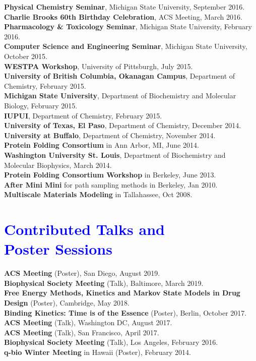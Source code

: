\documentclass[margin,line]{res}
\begin{document}
\begin{resume}
{\bf Physical Chemistry Seminar}, Michigan State University, September 2016. \\
{\bf Charlie Brooks 60th Birthday Celebration}, ACS Meeting, March 2016. \\
{\bf Pharmacology \& Toxicology Seminar}, Michigan State University, February 2016. \\
{\bf Computer Science and Engineering Seminar}, Michigan State University, October 2015. \\
{\bf WESTPA Workshop}, University of Pittsburgh, July 2015. \\
{\bf University of British Columbia, Okanagan Campus}, Department of Chemistry, February 2015. \\
{\bf Michigan State University}, Department of Biochemistry and Molecular Biology, February 2015. \\
{\bf IUPUI}, Department of Chemistry, February 2015. \\
{\bf University of Texas, El Paso}, Department of Chemistry, December 2014. \\
{\bf University at Buffalo}, Department of Chemistry, November 2014. \\
{\bf Protein Folding Consortium} in Ann Arbor, MI, June 2014. \\
{\bf Washington University St. Louis}, Department of Biochemistry and Molecular Biophysics, March 2014. \\
{\bf Protein Folding Consortium Workshop} in Berkeley, June 2013. \\
{\bf After Mini Mini} for path sampling methods in Berkeley, Jan 2010. \\
{\bf Multiscale Materials Modeling} in Tallahassee, Oct 2008. \\

\section{\sc \textcolor{blue}{ Contributed Talks and \\ Poster Sessions}}

{\bf ACS Meeting} (Poster), San Diego, August 2019. \\
{\bf Biophysical Society Meeting} (Talk), Baltimore, March 2019.\\
{\bf Free Energy Methods, Kinetics and Markov State Models in Drug Design} (Poster), Cambridge, May 2018. \\
{\bf Binding Kinetics: Time is of the Essence} (Poster), Berlin, October 2017.\\
{\bf ACS Meeting} (Talk), Washington DC, August 2017. \\
{\bf ACS Meeting} (Talk), San Francisco, April 2017. \\
{\bf Biophysical Society Meeting} (Talk), Los Angeles, February 2016. \\
{\bf q-bio Winter Meeting} in Hawaii (Poster), February 2014. \\


\end{resume}
\end{document}
